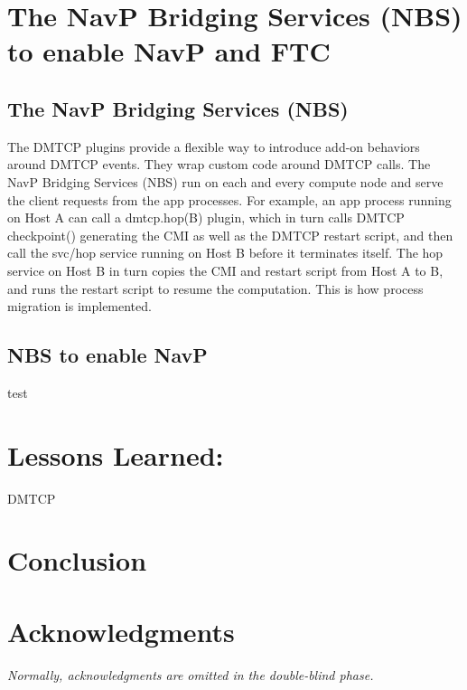 \documentclass[conference]{IEEEtran}
\newcommand{\TODO}[1]{{\color{blue}\textit{#1}}}
\begin{document}
\section{The NavP Bridging Services (NBS) to enable NavP and FTC}
\label{sec:s2}

\subsection{The NavP Bridging Services (NBS)}
\label{subsec:s21}

The DMTCP plugins provide a flexible way to introduce add-on behaviors around DMTCP events. They wrap custom code around DMTCP calls. The NavP Bridging Services (NBS) run on each and every compute node and serve the client requests from the app processes. For example, an app process running on Host A can call a dmtcp.hop(B) plugin, which in turn calls DMTCP checkpoint() generating the CMI as well as the DMTCP restart script, and then call the svc/hop service running on Host B before it terminates itself. The hop service on Host B in turn copies the CMI and restart script from Host A to B, and runs the restart script to resume the computation. This is how process migration is implemented.

\subsection{NBS to enable NavP}
\label{subsec:s22}
test
\section{Lessons Learned:  }
DMTCP\label{sec:lessons-learned}


\section{Conclusion}
\label{sec:conclusion}


\section*{Acknowledgments}
\TODO{Normally, acknowledgments are omitted in the double-blind phase.}



\end{document}
